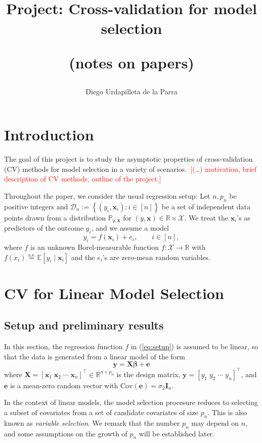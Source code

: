 \documentclass[12pt, letter paper]{article}
\title{Project: Cross-validation for model selection

(notes on papers)}
\author{Diego Urdapilleta de la Parra}
\newcommand{\1}{\mathmybb{1}}
\newcommand{\R}{\mathbb{R}}
\newcommand{\0}{\emptyset}
\newcommand{\prob}{\mathbb{P}}
\newcommand{\Ep}[1]{\mathbb{E}\left[ #1 \right]}
\newcommand{\paren}[1]{\left(#1 \right)}
\newcommand{\sqbr}[1]{\left[#1 \right]}
\newcommand{\set}[1]{\left\{ #1 \right\}}
\newcommand{\data}{\mathcal{D}_{n}}
\newcommand{\aseq}{\stackrel{\mathrm{a.s.}}{=}}
\newcommand{\X}{\boldsymbol{X}}
\newcommand{\x}{\boldsymbol{x}}
\newcommand{\y}{\boldsymbol{y}}
\newcommand{\e}{\boldsymbol{e}}
\newcommand{\Cov}[1]{\mathrm{Cov}\paren{#1}}
\newcommand{\bbeta}{\boldsymbol{\beta}}
\begin{document}
\maketitle
\tableofcontents

\newpage
\section{Introduction}

The goal of this project is to study the asymptotic properties of cross-validation (CV) methods for model selection in a variety of scenarios.~\textcolor{red}{[(\ldots) motivation, brief description of CV methods, outline of the project.]}

Throughout the paper, we consider the usual regression setup: Let \(n,p_{n}\) be positive integers and \(\data := \set{\paren{y_{i}, \x_{i}}:i\in [n]}\) be a set of independent data points drawn from a distribution \(\prob_{y, \x}\) for \((y, \x)\in\R\times \mathcal{X}\). We treat the \(\x_{i}\)'s as predictors of the outcome \(y_{i}\), and we assume a model
\begin{equation}\label{eq:setup}
    y_{i} = f(\x_{i}) + e_{i},\qquad i\in[n],
\end{equation}
where \(f\) is an unknown Borel-measurable function \(f:\mathcal{X}\to\R\) with \(f(x_i)\aseq \Ep{y_i\mid \x_i}\) and the \(e_{i}\)'s are zero-mean random variables.



\section{CV for Linear Model Selection}
\subsection{Setup and preliminary results}
In this section, the regression function \(f\) in (\ref{eq:setup}) is assumed to be linear, so that the data is generated from a linear model of the form
\[\y = \X\bbeta + \e\]
where \(\X = {[\x_{1}\;\x_{2}\;\cdots\;\x_{n}]}^{\top}\in\R^{n\times p_{n}}\) is the design matrix, \(\y = \sqbr{y_{1}\; y_{2}\;\cdots\; y_{n}}^{\top}\), and \(\e\) is a mean-zero random vector with \(\Cov{\e} = \sigma_{2}\boldsymbol{I}_{n}\).

In the context of linear models, the model selection procesure reduces to selecting a subset of covariates from a set of candidate covariates of size \(p_n\). This is also known as \emph{variable selection}. We remark that the number \(p_n\) may depend on \(n\), and some assumptions on the growth of \(p_n\) will be established later.
\end{document}
